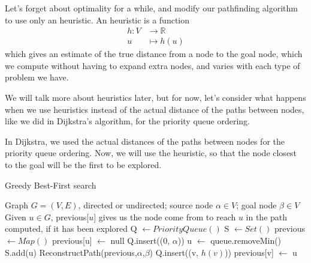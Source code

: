 \documentclass[12pt]{report}
\newtheorem{definition}[theorem]{Definition}
\begin{document}
Let's forget about optimality for a while, and modify our pathfinding algorithm to use only an heuristic. An heuristic is a function
\begin{align*}
	h \colon V &\to \mathbb{R}\\
	u &\mapsto h(u)
\end{align*}
which gives an estimate of the true distance from a node to the goal node, which we compute without having to expand extra nodes, and varies with each type of problem we have.

We will talk more about heuristics later, but for now, let's consider what happens when we use heuristics instead of the actual distance of the paths between nodes, like we did in Dijkstra's algorithm, for the priority queue ordering. 

In Dijkstra, we used the actual distances of the paths between nodes for the priority queue ordering. Now, we will use the heuristic, so that the node closest to the goal will be the first to be explored.

\begin{algorithm}
\caption{Greedy Best-First search}
\label{alg:greedy}
\begin{algorithmic}[1]
\Require Graph $G = (V, E)$, directed or undirected; source node $\alpha \in V$; goal node $\beta \in V$
\Ensure Given $u \in G$, previous[$u$] gives us the node come from to reach $u$ in the path computed, if it has been explored
\State Q $\gets PriorityQueue()$
\State S $\gets Set()$
\State previous $\gets Map()$
	\State previous[u] $\gets$ null
\EndFor
\State Q.insert((0, $\alpha$))
	\State u $\gets$ queue.removeMin()
	\State S.add(u)
	 
		\State \Return ReconstructPath(previous,$\alpha$,$\beta$)
	\EndIf
			\Continue
		\EndIf
		\State Q.insert((v, $h(v)$))
		\State previous[v] $\gets$ u
	\EndFor
\EndWhile
\EndProcedure
\end{algorithmic}
\end{algorithm}


\end{document}
